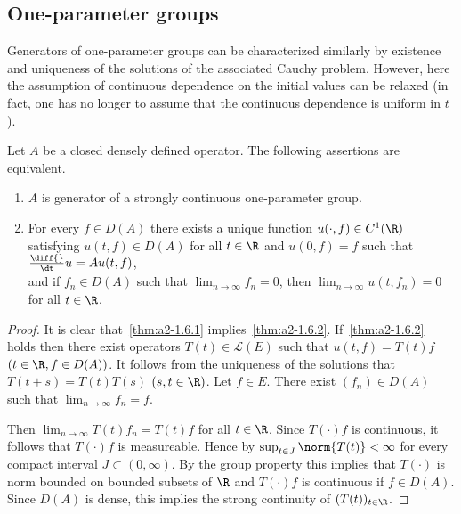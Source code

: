 \subsection{One-parameter groups} \label{subsec:a2-1.se2}%
%
Generators of one-parameter groups can be characterized similarly by existence and uniqueness of the solutions of the associated Cauchy problem.
However, here the assumption of continuous dependence on the initial values can be relaxed (in fact, one has no longer to assume that the continuous dependence is uniform in $t$).
\begin{theorem}\label{thm:a2-1.6}
Let $A$ be a closed densely defined operator.
The following assertions are equivalent.
\begin{enumerate}[\upshape (a)]
\item \label{thm:a2-1.6.1}
$A$ is generator of a strongly continuous one-parameter group.
\item  \label{thm:a2-1.6.2}
For every $f \in D(A)$ there exists a unique function $u(\cdot,f) \in C^{1}(\R)$ satisfying $u(t,f) \in D(A)$ for all $t \in \R$ and $u(0,f) = f$ such that $\frac{\diff{}}{\dt}u = Au(t,f)$, \\
and if\/ $f_{n} \in D(A)$ such that $\lim_{n \to \infty} f_{n} = 0$, then $\lim_{n \to \infty} u(t,f_{n}) = 0$ for all $t \in \R$.
\end{enumerate}
\end{theorem}
\begin{proof}
It is clear that~\ref{thm:a2-1.6.1}   implies~\ref{thm:a2-1.6.2}. 
If~\ref{thm:a2-1.6.2}   holds then there exist operators $T(t) \in \mathcal{L}(E)$ such that $u(t,f) = T(t)f$ $(t \in \R, f \in D(A))$.
It follows from the uniqueness of the solutions that $T(t+s) = T(t)T(s)$ $(s,t \in \R)$.
Let $f \in E$. 
There exist $(f_{n}) \in D(A)$ such that $\lim_{n \to \infty} f_{n} = f$.

Then $\lim_{n \to \infty} T(t)f_{n} = T(t)f$ for all $t \in \R$.
Since $T(\cdot)f$ is continuous, it follows that $T(\cdot)f$ is measureable.
Hence by 
\textcite[10.2.1]{hillephillips:1957} $\sup_{t \in J}\norm{T(t)} < \infty$ for every compact interval $J \subset (0,\infty)$.
By the group property this implies that $T(\cdot)$ is norm bounded on bounded subsets of\/ $\R$ and
$T(\cdot)f$ is continuous if\/ $f \in D(A)$.
Since $D(A)$ is dense, this implies the strong continuity of\/ $(T(t))_{t \in \R}$.
\end{proof}
